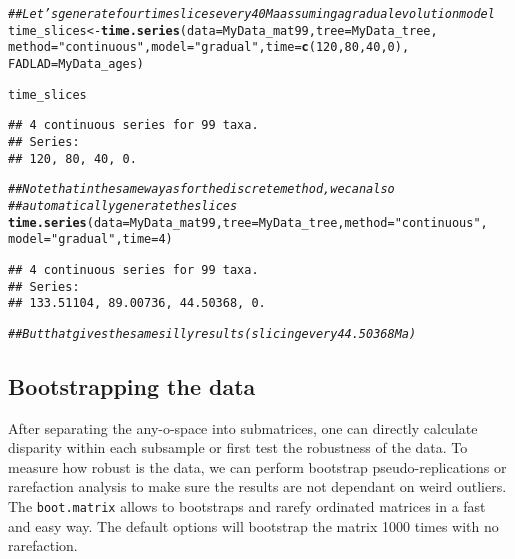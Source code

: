 \documentclass{article}\usepackage[]{graphicx}\usepackage[]{color}
\makeatletter
\newcommand{\hlnum}[1]{\textcolor[rgb]{0.686,0.059,0.569}{#1}}%
\newcommand{\hlstr}[1]{\textcolor[rgb]{0.192,0.494,0.8}{#1}}%
\newcommand{\hlcom}[1]{\textcolor[rgb]{0.678,0.584,0.686}{\textit{#1}}}%
\newcommand{\hlstd}[1]{\textcolor[rgb]{0.345,0.345,0.345}{#1}}%
\newcommand{\hlkwb}[1]{\textcolor[rgb]{0.69,0.353,0.396}{#1}}%
\newcommand{\hlkwc}[1]{\textcolor[rgb]{0.333,0.667,0.333}{#1}}%
\newcommand{\hlkwd}[1]{\textcolor[rgb]{0.737,0.353,0.396}{\textbf{#1}}}%
\newenvironment{kframe}{%
 \def\at@end@of@kframe{}%
 \ifinner\ifhmode%
  \def\at@end@of@kframe{\end{minipage}}%
  \begin{minipage}{\columnwidth}%
 \fi\fi%
 \def\FrameCommand##1{\hskip\@totalleftmargin \hskip-\fboxsep
 \colorbox{shadecolor}{##1}\hskip-\fboxsep
     \hskip-\linewidth \hskip-\@totalleftmargin \hskip\columnwidth}%
 \MakeFramed {\advance\hsize-\width
   \@totalleftmargin\z@ \linewidth\hsize
   \@setminipage}}%
 {\par\unskip\endMakeFramed%
 \at@end@of@kframe}
\newenvironment{knitrout}{}{} %
\makeatother
\begin{document}
\begin{knitrout}
\color{fgcolor}\begin{kframe}
\begin{alltt}
\hlcom{## Let's generate four time slices every 40 Ma assuming a gradual evolution model}
\hlstd{time_slices} \hlkwb{<-} \hlkwd{time.series}\hlstd{(}\hlkwc{data} \hlstd{= MyData_mat99,} \hlkwc{tree} \hlstd{= MyData_tree,}
    \hlkwc{method} \hlstd{=} \hlstr{"continuous"}\hlstd{,} \hlkwc{model} \hlstd{=} \hlstr{"gradual"}\hlstd{,} \hlkwc{time} \hlstd{=} \hlkwd{c}\hlstd{(}\hlnum{120}\hlstd{,} \hlnum{80}\hlstd{,} \hlnum{40}\hlstd{,} \hlnum{0}\hlstd{),}
    \hlkwc{FADLAD} \hlstd{= MyData_ages)}
\end{alltt}


{\ttfamily\noindent\itshape\color{messagecolor}{\#\# Some tips have FAD/LAD and are assumed to interval single points in time.}}\begin{alltt}
\hlstd{time_slices}
\end{alltt}
\begin{verbatim}
## 4 continuous series for 99 taxa. 
## Series:
## 120, 80, 40, 0.
\end{verbatim}
\begin{alltt}
\hlcom{## Note that in the same way as for the discrete method, we can also}
\hlcom{## automatically generate the slices}
\hlkwd{time.series}\hlstd{(}\hlkwc{data} \hlstd{= MyData_mat99,} \hlkwc{tree} \hlstd{= MyData_tree,} \hlkwc{method} \hlstd{=} \hlstr{"continuous"}\hlstd{,}
    \hlkwc{model} \hlstd{=} \hlstr{"gradual"}\hlstd{,} \hlkwc{time} \hlstd{=} \hlnum{4}\hlstd{)}
\end{alltt}


{\ttfamily\noindent\itshape\color{messagecolor}{\#\# No FADLAD table has been provided so every tip is assumed to interval single points in time.}}\begin{verbatim}
## 4 continuous series for 99 taxa. 
## Series:
## 133.51104, 89.00736, 44.50368, 0.
\end{verbatim}
\begin{alltt}
\hlcom{## But that gives the same silly results (slicing every 44.50368 Ma)}
\end{alltt}
\end{kframe}
\end{knitrout}

\subsection{Bootstrapping the data}
After separating the any-o-space into submatrices, one can directly calculate disparity within each subsample or first test the robustness of the data.
To measure how robust is the data, we can perform bootstrap pseudo-replications or rarefaction analysis to make sure the results are not dependant on weird outliers.
The \texttt{boot.matrix} allows to bootstraps and rarefy ordinated matrices in a fast and easy way.
The default options will bootstrap the matrix 1000 times with no rarefaction.
\end{document}
